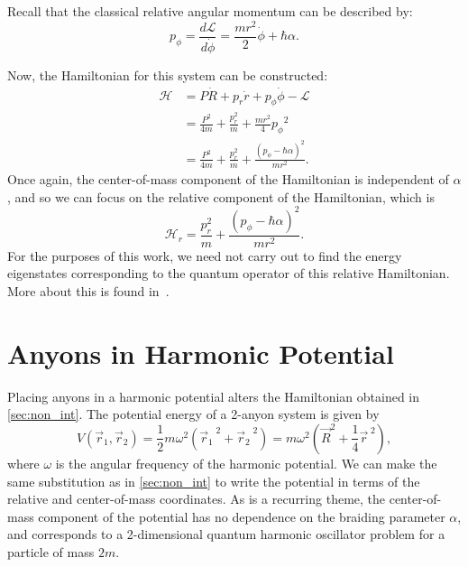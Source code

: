 Recall that the classical relative angular momentum can be described by:
\begin{equation}
    p_\phi = \frac{d\mathcal{L}}{d\dot{\phi}} = \frac{mr^2}{2}\dot{\phi} + \hbar\alpha.
\end{equation}

Now, the Hamiltonian for this system can be constructed:
\begin{align}
    \mathcal{H} 
    &= P\dot{R} + p_r\dot{r} + p_\phi\dot{\phi} - \mathcal{L} \nonumber \\
    &= \frac{P^2}{4m} + \frac{p_r^{2}}{m} + \frac{mr^2}{4} {p_\phi}^2 \nonumber \\
    &= \frac{P^2}{4m} + \frac{p_r^{2}}{m} + \frac{{\left( p_\phi - \hbar\alpha \right)}^2}{mr^2}.
\end{align}
Once again, the center-of-mass component of the Hamiltonian is independent of $\alpha$, and so we can focus on the relative component of the Hamiltonian, which is
\begin{equation}
    \mathcal{H}_r = \frac{p_r^{2}}{m} + \frac{{\left( p_\phi - \hbar\alpha \right)}^2}{mr^2}.\label{eq:basic_Hr}
\end{equation}
For the purposes of this work, we need not carry out to find the energy eigenstates corresponding to the quantum operator of this relative Hamiltonian. More about this is found in~\cite{Khare2005}.


\section{Anyons in Harmonic Potential}\label{sec:mult_harmonic}

Placing anyons in a harmonic potential alters the Hamiltonian obtained in \cref{sec:non_int}. The potential energy of a 2-anyon system is given by
\begin{equation}
    V(\vec{r}_1,\vec{r}_2) = \frac{1}{2}m\omega^2\left( {\vec{r}_1}^{\;2} + {\vec{r}_2}^{\;2} \right) = m\omega^2\left( {\vec{R}}^2 + \frac{1}{4}{\vec{r}}^{\;2} \right),
\end{equation}
where $\omega$ is the angular frequency of the harmonic potential. We can make the same substitution as in \cref{sec:non_int} to write the potential in terms of the relative and center-of-mass coordinates. As is a recurring theme, the center-of-mass component of the potential has no dependence on the braiding parameter $\alpha$, and corresponds to a 2-dimensional quantum harmonic oscillator problem for a particle of mass $2m$.


